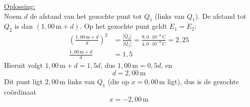 \documentclass{ximera}
\begin{document}
\begin{exercise}
\begin{question}
\begin{solution}
            \underline{Oplossing:}\\
            Noem $d$ de afstand van het gezochte punt tot $Q_1$ (links van $Q_1$). De afstand tot $Q_2$ is dan $(1{,}00 \, \mathrm{m} + d)$. Op het gezochte punt geldt $E_1 = E_2$:
            \begin{align*}
                \left(\frac{1{,}00 \, \mathrm{m} + d}{d}\right)^{2} &= \frac{|Q_2|}{|Q_1|} = \frac{9{,}0 \cdot 10^{-6} \, \mathrm{C}}{4{,}0 \cdot 10^{-6} \, \mathrm{C}} = 2{,}25 \\
                \frac{1{,}00 \, \mathrm{m} + d}{d} &= 1{,}5
            \end{align*}
            Hieruit volgt $1{,}00 \, \mathrm{m} + d = 1{,}5d$, dus $1{,}00 \, \mathrm{m} = 0{,}5d$, en
            \[
                d = 2{,}00 \, \mathrm{m}
            \]
            Dit punt ligt $2{,}00 \, \mathrm{m}$ links van $Q_1$ (die op $x=0{,}00 \, \mathrm{m}$ ligt), dus is de gezochte coördinaat
            \[
                x = \boxed{-2{,}00 \, \mathrm{m}}
            \]
        \end{solution}
    \end{question}
\end{exercise}
\end{document}
